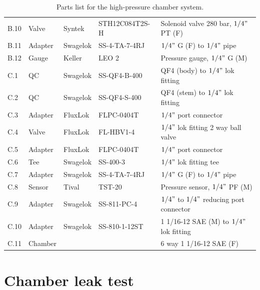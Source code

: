 \begin{table}[h!]
\begin{tabular}{lllll}
B.10  & Valve       & Syntek   & STH12C084T2S-H & Solenoid valve 280 bar, $1/4"$ PT (F)                \\
B.11  & Adapter     & Swagelok & SS-4-TA-7-4RJ  & $1/4"$ G (F) to $1/4"$ pipe                           \\
B.12  & Gauge       & Keller   & LEO 2          & Pressure gauge, $1/4"$ G (M) \\
\hline
C.1   & QC          & Swagelok & SS-QF4-B-400   & QF4 (body) to $1/4"$ lok fitting                                   \\
C.2   & QC          & Swagelok & SS-QF4-S-400   & QF4 (stem) to $1/4"$ lok fitting                                   \\
C.3   & Adapter     & FluxLok  & FLPC-0404T     & $1/4"$ port connector                                              \\
C.4   & Valve       & FluxLok  & FL-HBV1-4      & $1/4"$ lok fitting 2 way ball valve      \\
C.5   & Adapter     & FluxLok  & FLPC-0404T     & $1/4"$ port connector                                              \\
C.6   & Tee   & Swagelok & SS-400-3       & $1/4"$ lok fitting tee                                             \\
C.7   & Adapter     & Swagelok & SS-4-TA-7-4RJ  & $1/4"$ G (F) to $1/4"$ pipe                           \\
C.8   & Sensor      & Tival    & TST-20         & Pressure sensor, $1/4"$ PF (M)        \\
C.9   & Adapter     & Swagelok & SS-811-PC-4    & $1/4"$ to $1/4"$ reducing port connector                               \\
C.10  & Adapter     & Swagelok & SS-810-1-12ST  & 1 1/16-12 SAE (M) to $1/4"$ lok fitting                            \\
C.11  & Chamber     &          &                & 6 way 1 1/16-12 SAE (F) \\
\hline \hline
\end{tabular}
\caption{Parts list for the high-pressure chamber system.}
\label{table:partList}
\end{table}

\pagebreak

\section{Chamber leak test}
\label{sec:ap2-2}

